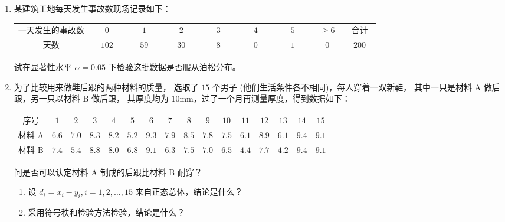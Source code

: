 \begin{enumerate}
\item 某建筑工地每天发生事故数现场记录如下：
\begin{center}\begin{tabular}{ccccccccc}
一天发生的事故数 &\ \ \ $0$\ \ \ &\ \ \ $1$\ \ \ &\ \ \ $2$\ \ \ &\ \ \ $3$\ \ \ &\ \ \ $4$\ \ \ &\ \ \ $5$\ \ \ &\ $\geq 6$\ &\ 合计\ \\
天数 & $102$ & $59$ & $30$ & $8$ & $0$ & $1$ & $0$ & $200$
\end{tabular}\end{center}
试在显著性水平 $\alpha=0.05$ 下检验这批数据是否服从泊松分布。
\item 为了比较用来做鞋后跟的两种材料的质量，
选取了 $15$ 个男子 (他们生活条件各不相同)，每人穿着一双新鞋，
其中一只是材料 $\text{A}$ 做后跟，另一只以材料 $\text{B}$ 做后跟，
其厚度均为 $10\text{mm}$，过了一个月再测量厚度，得到数据如下：
\begin{center}\begin{tabular}{cccccccccccccccc}
序号 & $1$ & $2$ & $3$ & $4$ & $5$ & $6$ & $7$ & $8$ & $9$ & $10$ & $11$ & $12$ & $13$ & $14$ & $15$ \\
材料 $\text{A}$ & $6.6$ & $7.0$ & $8.3$ & $8.2$ & $5.2$ & $9.3$ & $7.9$ & $8.5$ & $7.8$ & $7.5$ & $6.1$ & $8.9$ & $6.1$ & $9.4$ & $9.1$ \\
材料 $\text{B}$ & $7.4$ & $5.4$ & $8.8$ & $8.0$ & $6.8$ & $9.1$ & $6.3$ & $7.5$ & $7.0$ & $6.5$ & $4.4$ & $7.7$ & $4.2$ & $9.4$ & $9.1$
\end{tabular}\end{center}
问是否可以认定材料 $\text{A}$ 制成的后跟比材料 $\text{B}$ 耐穿？
\begin{enumerate}[label=(\arabic*)]
\item 设 $d_{i}=x_{i}-y_{i}, i=1,2, \ldots, 15$ 来自正态总体，结论是什么？
\item 采用符号秩和检验方法检验，结论是什么？
\end{enumerate}
\end{enumerate}